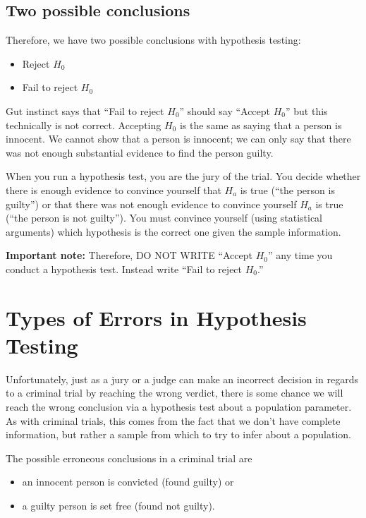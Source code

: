 \documentclass[]{tufte-book}
\providecommand{\tightlist}{%
  \setlength{\itemsep}{0pt}\setlength{\parskip}{0pt}}
\begin{document}
\subsection{Two possible conclusions}\label{two-possible-conclusions}

Therefore, we have two possible conclusions with hypothesis testing:

\begin{itemize}
\tightlist
\item
  Reject \(H_0\)\\
\item
  Fail to reject \(H_0\)
\end{itemize}

Gut instinct says that ``Fail to reject \(H_0\)'' should say ``Accept
\(H_0\)'' but this technically is not correct. Accepting \(H_0\) is the
same as saying that a person is innocent. We cannot show that a person
is innocent; we can only say that there was not enough substantial
evidence to find the person guilty.

When you run a hypothesis test, you are the jury of the trial. You
decide whether there is enough evidence to convince yourself that
\(H_a\) is true (``the person is guilty'') or that there was not enough
evidence to convince yourself \(H_a\) is true (``the person is not
guilty''). You must convince yourself (using statistical arguments)
which hypothesis is the correct one given the sample information.

\textbf{Important note:} Therefore, DO NOT WRITE ``Accept \(H_0\)'' any
time you conduct a hypothesis test. Instead write ``Fail to reject
\(H_0\).''

\section{Types of Errors in Hypothesis
Testing}\label{types-of-errors-in-hypothesis-testing}

Unfortunately, just as a jury or a judge can make an incorrect decision
in regards to a criminal trial by reaching the wrong verdict, there is
some chance we will reach the wrong conclusion via a hypothesis test
about a population parameter. As with criminal trials, this comes from
the fact that we don't have complete information, but rather a sample
from which to try to infer about a population.

The possible erroneous conclusions in a criminal trial are

\begin{itemize}
\tightlist
\item
  an innocent person is convicted (found guilty) or
\item
  a guilty person is set free (found not guilty).
\end{itemize}
\end{document}
